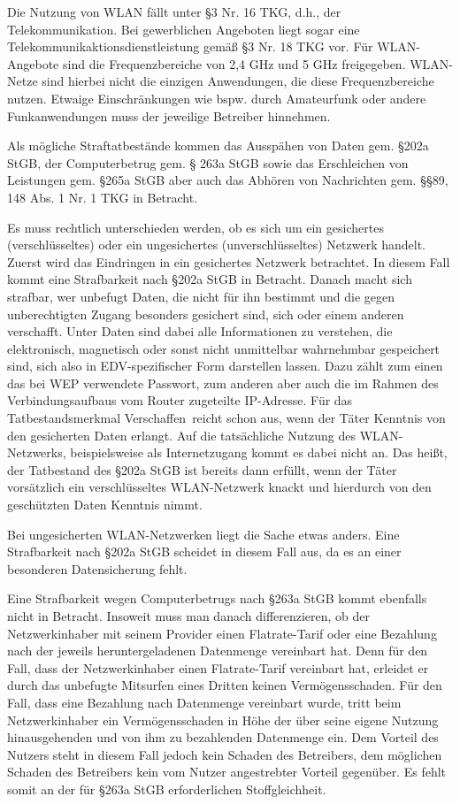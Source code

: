 \documentclass[10pt,a4paper]{article}
\begin{document}
Die Nutzung von WLAN fällt unter §3 Nr. 16 TKG, d.h., der Telekommunikation. Bei gewerblichen Angeboten liegt sogar eine Telekommunikaktionsdienstleistung gemäß §3 Nr. 18 TKG vor. Für WLAN-Angebote sind die Frequenzbereiche von 2,4 GHz und 5 GHz freigegeben. WLAN-Netze sind hierbei nicht die einzigen Anwendungen, die diese Frequenzbereiche nutzen. Etwaige Einschränkungen wie bspw. durch Amateurfunk oder andere Funkanwendungen muss der jeweilige Betreiber hinnehmen.

Als mögliche Straftatbestände kommen das Ausspähen von Daten gem. §202a StGB, der Computerbetrug gem. § 263a StGB sowie das Erschleichen von Leistungen gem. §265a StGB aber auch das Abhören von Nachrichten gem. §§89, 148 Abs. 1 Nr. 1 TKG in Betracht. 

Es muss rechtlich unterschieden werden, ob es sich um ein gesichertes (verschlüsseltes) oder ein ungesichertes (unverschlüsseltes) Netzwerk handelt. Zuerst wird das Eindringen in ein gesichertes Netzwerk betrachtet. In diesem Fall kommt eine Strafbarkeit nach §202a StGB in Betracht. Danach macht sich strafbar, wer unbefugt Daten, die nicht für ihn bestimmt und die gegen unberechtigten Zugang besonders gesichert sind, sich oder einem anderen verschafft. Unter Daten sind dabei alle Informationen zu verstehen, die elektronisch, magnetisch oder sonst nicht unmittelbar wahrnehmbar gespeichert sind, sich also in EDV-spezifischer Form darstellen lassen. Dazu zählt zum einen das bei WEP verwendete Passwort, zum anderen aber auch die im Rahmen des Verbindungsaufbaus vom Router zugeteilte IP-Adresse. Für das Tatbestandsmerkmal \glqq Verschaffen\grqq \ reicht schon aus, wenn der Täter Kenntnis von den gesicherten Daten erlangt. Auf die tatsächliche Nutzung des WLAN-Netzwerks, beispielsweise als Internetzugang kommt es dabei nicht an. Das heißt, der Tatbestand des §202a StGB ist bereits dann erfüllt, wenn der Täter vorsätzlich ein verschlüsseltes WLAN-Netzwerk knackt und hierdurch von den geschützten Daten Kenntnis nimmt.

Bei ungesicherten WLAN-Netzwerken liegt die Sache etwas anders. Eine Strafbarkeit nach §202a StGB scheidet in diesem Fall aus, da es an einer besonderen Datensicherung fehlt. 

Eine Strafbarkeit wegen Computerbetrugs nach §263a StGB kommt ebenfalls nicht in Betracht. Insoweit muss man danach differenzieren, ob der Netzwerkinhaber mit seinem Provider einen Flatrate-Tarif oder eine Bezahlung nach der jeweils heruntergeladenen Datenmenge vereinbart hat. Denn für den Fall, dass der Netzwerkinhaber einen Flatrate-Tarif vereinbart hat, erleidet er durch das unbefugte Mitsurfen eines Dritten keinen Vermögensschaden. Für den Fall, dass eine Bezahlung nach Datenmenge vereinbart wurde, tritt beim Netzwerkinhaber ein Vermögensschaden in Höhe der über seine eigene Nutzung hinausgehenden und von ihm zu bezahlenden Datenmenge ein. Dem Vorteil des Nutzers steht in diesem Fall jedoch kein Schaden des Betreibers, dem möglichen Schaden des Betreibers kein vom Nutzer angestrebter Vorteil gegenüber. Es fehlt somit an der für §263a StGB erforderlichen Stoffgleichheit.
\end{document}
